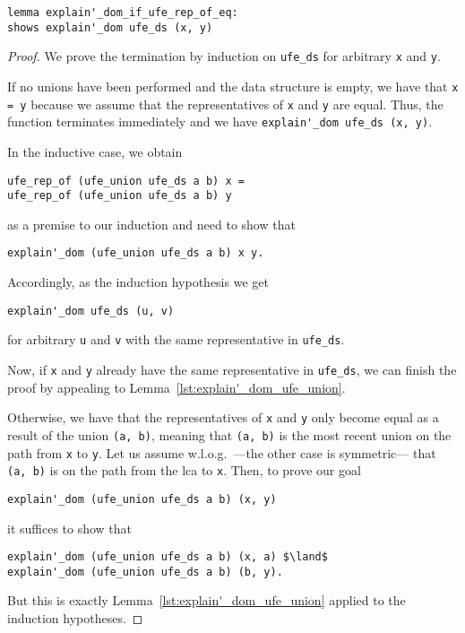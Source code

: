 \documentclass[
  sigplan,
  10pt,
  anonymous,
  review,
  ]{acmart}
\begin{document}
\begin{lstlisting}
lemma explain'_dom_if_ufe_rep_of_eq:
shows explain'_dom ufe_ds (x, y)
\end{lstlisting}
\begin{proof}
  We prove the termination by induction on \lstinline|ufe_ds| for arbitrary \lstinline|x| and \lstinline|y|.

  If no unions have been performed and the data structure is empty, we have that \lstinline|x = y| because we assume that the representatives of \lstinline|x| and \lstinline|y| are equal.
  Thus, the function terminates immediately and we have \lstinline|explain'_dom ufe_ds (x, y)|.

  In the inductive case, we obtain
  \begin{lstlisting}
ufe_rep_of (ufe_union ufe_ds a b) x =
ufe_rep_of (ufe_union ufe_ds a b) y
  \end{lstlisting}
  as a premise to our induction and need to show that
  \begin{lstlisting}
explain'_dom (ufe_union ufe_ds a b) x y.
  \end{lstlisting}
  Accordingly, as the induction hypothesis we get
  \begin{lstlisting}
explain'_dom ufe_ds (u, v)
  \end{lstlisting}
  for arbitrary \lstinline|u| and \lstinline|v| with the same representative in \lstinline|ufe_ds|.

  Now, if \lstinline|x| and \lstinline|y| already have the same representative in \lstinline|ufe_ds|, we can finish the proof by appealing to Lemma~\ref{lst:explain'_dom_ufe_union}.

  Otherwise, we have that the representatives of \lstinline|x| and \lstinline|y| only become equal as a result of the union \lstinline|(a, b)|,
  meaning that \lstinline|(a, b)| is the most recent union on the path from \lstinline|x| to \lstinline|y|.
  Let us assume w.l.o.g.\ ---the other case is symmetric--- that \lstinline|(a, b)| is on the path from the \acrshort{lca} to \lstinline|x|.
  Then, to prove our goal
  \begin{lstlisting}
explain'_dom (ufe_union ufe_ds a b) (x, y)
  \end{lstlisting}
  it suffices to show that
  \begin{lstlisting}
explain'_dom (ufe_union ufe_ds a b) (x, a) $\land$
explain'_dom (ufe_union ufe_ds a b) (b, y).
  \end{lstlisting}
  But this is exactly Lemma~\ref{lst:explain'_dom_ufe_union} applied to the induction hypotheses.
\end{proof}
\end{document}
